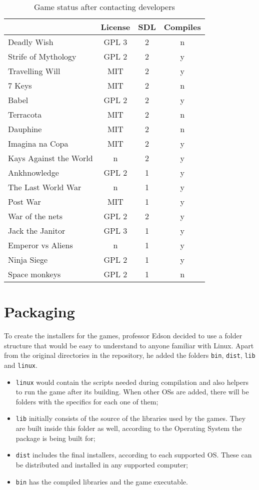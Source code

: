 \begin{table}[h!]
\centering
\caption{Game status after contacting developers}
\label{tab:final_games}
\begin{tabular}{lccc}
\toprule
\textbf{} & \multicolumn{1}{l}{\textbf{License}} & \multicolumn{1}{l}{\textbf{SDL}} & \multicolumn{1}{l}{\textbf{Compiles}} \\
\midrule
Deadly Wish & GPL 3 & 2 & n \\
Strife of Mythology & GPL 2 & 2 & y \\
Travelling Will & MIT & 2 & y \\
7 Keys & MIT & 2 & n \\
Babel & GPL 2 & 2 & y \\
Terracota & MIT & 2 & n \\
Dauphine & MIT & 2 & n \\
Imagina na Copa & MIT & 2 & y \\
Kays Against the World & n & 2 & y \\
Ankhnowledge & GPL 2 & 1 & y \\
The Last World War & n & 1 & y \\
Post War & MIT & 1 & y \\
War of the nets & GPL 2 & 2 & y \\
Jack the Janitor & GPL 3 & 1 & y \\
Emperor vs Aliens & n & 1 & y \\
Ninja Siege & GPL 2 & 1 & y \\
Space monkeys & GPL 2 & 1 & n \\
\bottomrule
\end{tabular}
\end{table}


\section{Packaging}
\label{sec:packaging}

To create the installers for the games, professor Edson decided to use a folder structure that would be easy to understand to anyone familiar with Linux. Apart from the original directories in the repository, he added the folders \texttt{bin}, \texttt{dist}, \texttt{lib} and \texttt{linux}.

\begin{itemize}
\item \texttt{linux} would contain the scripts needed during compilation and also helpers to run the game after its building. When other OSs are added, there will be folders with the specifics for each one of them;
\item \texttt{lib} initially consists of the source of the libraries used by the games. They are built inside this folder as well, according to the Operating System the package is being built for;
\item \texttt{dist} includes the final installers, according to each supported OS. These can be distributed and installed in any supported computer;
\item \texttt{bin} has the compiled libraries and the game executable.

\end{itemize}

